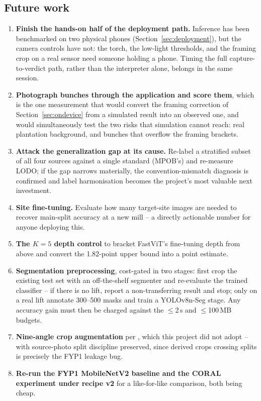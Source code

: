 \documentclass{article}
\begin{document}
\subsection{Future work}
\label{sec:futurework}

\begin{enumerate}
  \item \textbf{Finish the hands-on half of the deployment path.} Inference has been benchmarked on two
  physical phones (Section~\ref{sec:deployment}), but the camera controls have not: the torch, the
  low-light thresholds, and the framing crop on a real sensor need someone holding a phone. Timing the
  full capture-to-verdict path, rather than the interpreter alone, belongs in the same session.
  \item \textbf{Photograph bunches through the application and score them}, which is the one measurement
  that would convert the framing correction of Section~\ref{sec:ondevice} from a simulated result into an
  observed one, and would simultaneously test the two risks that simulation cannot reach: real plantation
  background, and bunches that overflow the framing brackets.
  \item \textbf{Attack the generalization gap at its cause.} Re-label a stratified subset of all four
  sources against a single standard (MPOB's) and re-measure LODO; if the gap narrows materially, the
  convention-mismatch diagnosis is confirmed and label harmonisation becomes the project's most valuable
  next investment.
  \item \textbf{Site fine-tuning.} Evaluate how many target-site images are needed to recover main-split
  accuracy at a new mill -- a directly actionable number for anyone deploying this.
  \item \textbf{The $K{=}5$ depth control} to bracket FastViT's fine-tuning depth from above and convert
  the 1.82-point upper bound into a point estimate.
  \item \textbf{Segmentation preprocessing}, cost-gated in two stages: first crop the existing test set
  with an off-the-shelf segmenter and re-evaluate the trained classifier -- if there is no lift, report a
  non-transferring result and stop; only on a real lift annotate 300--500 masks and train a YOLOv8n-Seg
  stage. Any accuracy gain must then be charged against the $\leq$2\,s and $\leq$100\,MB budgets.
  \item \textbf{Nine-angle crop augmentation} per \citet{suharjito2021mobile}, which this project did not
  adopt -- with source-photo split discipline preserved, since derived crops crossing splits is precisely
  the FYP1 leakage bug.
  \item \textbf{Re-run the FYP1 MobileNetV2 baseline and the CORAL experiment under recipe v2} for a
  like-for-like comparison, both being cheap.
\end{enumerate}
\end{document}
